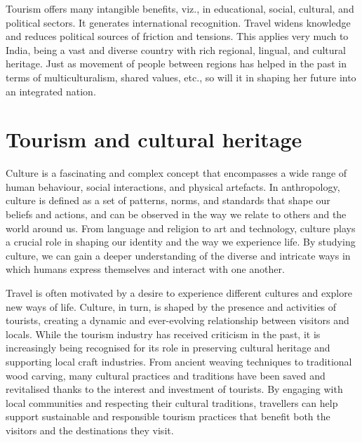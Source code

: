 Tourism offers many intangible benefits, viz., in educational, social, cultural, and political sectors. It generates international recognition. Travel widens knowledge and reduces political sources of friction and tensions. This applies very much to India, being a vast and diverse country with rich regional, lingual, and cultural heritage. Just as movement of people between regions has helped in the past in terms of multiculturalism, shared values, etc., so will it in shaping her future into an integrated nation.


\section{Tourism and cultural heritage} %
\label{sec:tch}

Culture is a fascinating and complex concept that encompasses a wide range of human behaviour, social interactions, and physical artefacts. In anthropology, culture is defined as a set of patterns, norms, and standards that shape our beliefs and actions, and can be observed in the way we relate to others and the world around us. From language and religion to art and technology, culture plays a crucial role in shaping our identity and the way we experience life. By studying culture, we can gain a deeper understanding of the diverse and intricate ways in which humans express themselves and interact with one another.

Travel is often motivated by a desire to experience different cultures and explore new ways of life. Culture, in turn, is shaped by the presence and activities of tourists, creating a dynamic and ever-evolving relationship between visitors and locals. While the tourism industry has received criticism in the past, it is increasingly being recognised for its role in preserving cultural heritage and supporting local craft industries. From ancient weaving techniques to traditional wood carving, many cultural practices and traditions have been saved and revitalised thanks to the interest and investment of tourists. By engaging with local communities and respecting their cultural traditions, travellers can help support sustainable and responsible tourism practices that benefit both the visitors and the destinations they visit.


